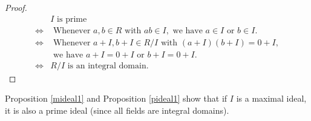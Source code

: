 \documentclass[egregdoesnotlikesansseriftitles,a4paper]{scrartcl}
\begin{document}
\begin{proof}
       \begin{align*}
            &I \text{ is prime } \\
            \iff & \text{ Whenever } a,b \in R \text{ with } ab \in I, \text{ we have } a \in I \text{ or } b \in I. \\
            \iff & \text{ Whenever } a+I,b+I \in R/I \text{ with } (a+I)(b+I)=0+I,\\& \text{ we have } a+I=0+I \text{ or } b+I=0+I.\\
            \iff & R/I \text{ is an integral domain.} 
       \end{align*}
\end{proof}
\begin{remark}
       Proposition \ref{mideal1} and Proposition \ref{pideal1} show that if $I$ is a maximal ideal, it is also a prime ideal (since all fields are integral domains).
\end{remark}
\end{document}
